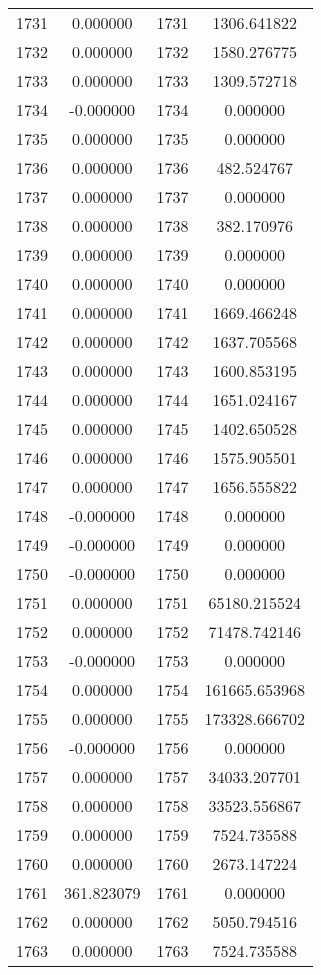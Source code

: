 \documentclass[12pt]{article}
\begin{document}
\begin{longtable}{@{}cccc@{}}
1731 & 0.000000 & 1731 & 1306.641822 \\
1732 & 0.000000 & 1732 & 1580.276775 \\
1733 & 0.000000 & 1733 & 1309.572718 \\
1734 & -0.000000 & 1734 & 0.000000 \\
1735 & 0.000000 & 1735 & 0.000000 \\
1736 & 0.000000 & 1736 & 482.524767 \\
1737 & 0.000000 & 1737 & 0.000000 \\
1738 & 0.000000 & 1738 & 382.170976 \\
1739 & 0.000000 & 1739 & 0.000000 \\
1740 & 0.000000 & 1740 & 0.000000 \\
1741 & 0.000000 & 1741 & 1669.466248 \\
1742 & 0.000000 & 1742 & 1637.705568 \\
1743 & 0.000000 & 1743 & 1600.853195 \\
1744 & 0.000000 & 1744 & 1651.024167 \\
1745 & 0.000000 & 1745 & 1402.650528 \\
1746 & 0.000000 & 1746 & 1575.905501 \\
1747 & 0.000000 & 1747 & 1656.555822 \\
1748 & -0.000000 & 1748 & 0.000000 \\
1749 & -0.000000 & 1749 & 0.000000 \\
1750 & -0.000000 & 1750 & 0.000000 \\
1751 & 0.000000 & 1751 & 65180.215524 \\
1752 & 0.000000 & 1752 & 71478.742146 \\
1753 & -0.000000 & 1753 & 0.000000 \\
1754 & 0.000000 & 1754 & 161665.653968 \\
1755 & 0.000000 & 1755 & 173328.666702 \\
1756 & -0.000000 & 1756 & 0.000000 \\
1757 & 0.000000 & 1757 & 34033.207701 \\
1758 & 0.000000 & 1758 & 33523.556867 \\
1759 & 0.000000 & 1759 & 7524.735588 \\
1760 & 0.000000 & 1760 & 2673.147224 \\
1761 & 361.823079 & 1761 & 0.000000 \\
1762 & 0.000000 & 1762 & 5050.794516 \\
1763 & 0.000000 & 1763 & 7524.735588 \\

\end{longtable}
\end{document}
